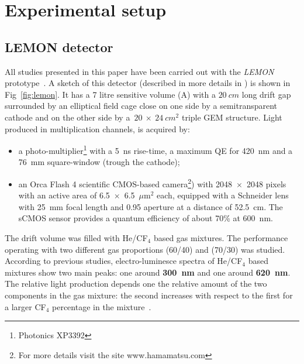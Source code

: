 \documentclass[a4paper,11pt]{article}
\begin{document}
\section{Experimental setup}

\subsection{LEMON detector}
\label{sect:lemon}
All studies presented in this paper have been carried out with the {\it LEMON} prototype~\cite{bib:eps, bib:ieee17, bib:ieee18}.
A sketch of this detector (described in more details in \cite{bib:fe55}) is shown in Fig~\ref{fig:lemon}.
It has a 7 litre sensitive volume (A) with a $20~cm$ long drift gap surrounded by an elliptical field cage close on one side by a semitransparent cathode and on the other side by a~$20~\times~24~cm^2$ triple GEM structure.
Light produced in multiplication channels, is acquired by:
\begin{itemize}
    \item a photo-multiplier\footnote{Photonics XP3392} with a 5~ns rise-time, a maximum QE for 420~nm and a 76~mm square-window (trough the cathode);
    \item an Orca Flash 4 scientific CMOS-based camera\footnote{For more details visit the site www.hamamatsu.com}) with 2048~$\times$~2048 pixels with an active area of 6.5~$\times$~6.5~$\mu$m$^2$ each, equipped with a Schneider lens with 25~mm focal length and 0.95 aperture at a distance of 52.5~cm. The sCMOS sensor provides a quantum efficiency of about 70\% at 600~nm.
\end{itemize}
 
The drift volume was filled with He/CF$_4$ based gas mixtures. 
The performance operating with two different gas proportions (60/40) and (70/30) was studied.
According to previous studies, 
electro-luminesce spectra of He/CF$_4$ based mixtures show two main peaks: one around {\bf 300~nm} and one around {\bf 620~nm}. The relative light production depends one the relative amount of the two components in the gas mixture: the second increases with respect to the first for a larger CF$_4$ percentage in the mixture~\cite{bib:Fraga}.
\end{document}
